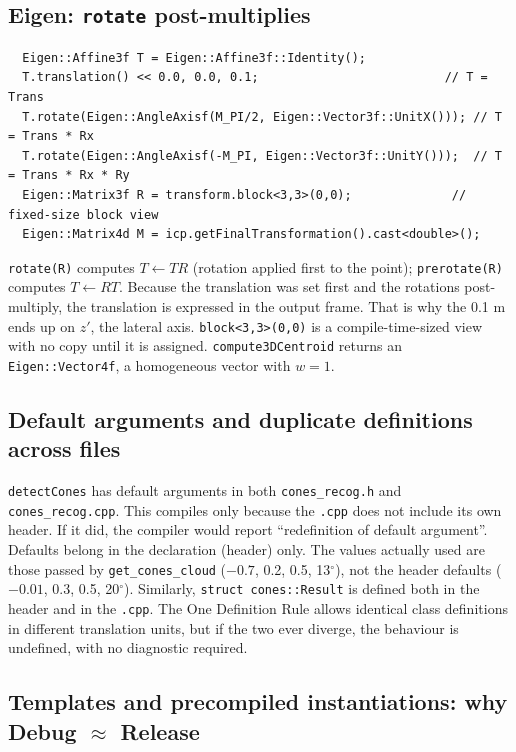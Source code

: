 \documentclass[10pt,a4paper]{scrartcl}
\renewcommand{\emph}[1]{\textcolor{accent}{#1}}
\newcommand{\code}[1]{\texttt{#1}}
\newcommand{\file}[1]{\texttt{\small #1}}
\begin{document}
  \subsection{Eigen: \texttt{rotate} post-multiplies}

  \begin{lstlisting}
  Eigen::Affine3f T = Eigen::Affine3f::Identity();
  T.translation() << 0.0, 0.0, 0.1;                          // T = Trans
  T.rotate(Eigen::AngleAxisf(M_PI/2, Eigen::Vector3f::UnitX())); // T = Trans * Rx
  T.rotate(Eigen::AngleAxisf(-M_PI, Eigen::Vector3f::UnitY()));  // T = Trans * Rx * Ry
  Eigen::Matrix3f R = transform.block<3,3>(0,0);              // fixed-size block view
  Eigen::Matrix4d M = icp.getFinalTransformation().cast<double>();
  \end{lstlisting}
  \code{rotate(R)} computes $T\leftarrow T R$ (rotation applied \emph{first} to the
  point); \code{prerotate(R)} computes $T\leftarrow RT$. Because the translation was
  set first and the rotations post-multiply, the translation is expressed in the
  \emph{output} frame. That is why the 0.1 m ends up on $z'$, the lateral axis.
  \code{block<3,3>(0,0)} is a compile-time-sized view with no copy until it is
  assigned. \code{compute3DCentroid} returns an \code{Eigen::Vector4f}, a homogeneous
  vector with $w=1$.

  \subsection{Default arguments and duplicate definitions across files}

  \code{detectCones} has default arguments in both \file{cones\_recog.h} and
  \file{cones\_recog.cpp}. This compiles only because the \file{.cpp} does not include
  its own header. If it did, the compiler would report ``redefinition of default
  argument''. Defaults belong in the declaration (header) only. The values actually
  used are those passed by \code{get\_cones\_cloud} ($-0.7$, 0.2, 0.5, 13$^\circ$),
  not the header defaults ($-0.01$, 0.3, 0.5, 20$^\circ$). Similarly,
  \code{struct cones::Result} is defined both in the header and in the \file{.cpp}.
  The One Definition Rule allows identical class definitions in different translation
  units, but if the two ever diverge, the behaviour is undefined, with no diagnostic
  required.

  \subsection{Templates and precompiled instantiations: why Debug \texorpdfstring{$\approx$}{~} Release}
\end{document}
